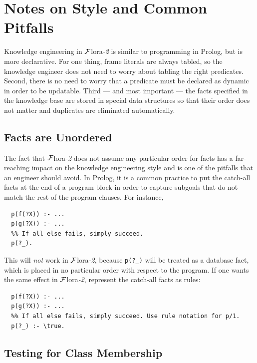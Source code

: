 \documentclass[11pt]{article}
\newcommand{\FLORA}{{\mbox{\sc ${\cal F}${lora}\rm\emph{-2}}}\xspace}
\newcommand{\FLSYSTEM}{\FLORA}
\begin{document}
\ifdef{\isfloraman}{}
{
  
}

\section{Notes on Style and Common Pitfalls}

Knowledge engineering
in \FLSYSTEM is similar to programming in Prolog, but is more
declarative. For one thing, frame literals are always tabled, so the
knowledge engineer does not need to worry about tabling the right predicates.
Second, there is no need to worry that a predicate must be declared as
dynamic in order to be updatable. Third --- and most important --- the facts 
specified in the knowledge base are stored in special data structures so
that their order does not matter and duplicates are eliminated automatically. 

\subsection{Facts are Unordered}

The fact that \FLSYSTEM does not assume any particular order for facts has a
far-reaching impact on the knowledge engineering style and is one of the
pitfalls that an engineer should avoid.  In Prolog, it is a
common practice to put the catch-all facts at the end of a program block in
order to capture subgoals that do not match the rest of the program
clauses. For instance,
\begin{verbatim}
  p(f(?X)) :- ...
  p(g(?X)) :- ...
  %% If all else fails, simply succeed.
  p(?_).
\end{verbatim}
This will \emph{not} work in \FLSYSTEM, because {\tt p(?\_)} will be treated as a
database fact, which is placed in no particular order with respect to the
program. If one wants the same effect in \FLSYSTEM, represent the catch-all
facts as rules: 
\begin{verbatim}
  p(f(?X)) :- ...
  p(g(?X)) :- ...
  %% If all else fails, simply succeed. Use rule notation for p/1.
  p(?_) :- \true.
\end{verbatim}

\subsection{Testing for Class Membership}
\end{document}
